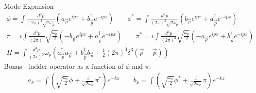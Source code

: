 \documentclass{article}
\begin{document}
Mode Expansion
\begin{equation*}
\begin{gathered}
    \phi = \int \frac{d^3p}{(2\pi)^3\sqrt{2\omega_p}}\left(
        a_{\vec{p}}e^{ipx} + b^\dagger_{\vec{p}}e^{-ipx}
    \right)
    \qquad
    \phi^* = \int \frac{d^3p}{(2\pi)^3\sqrt{2\omega_p}}\left(
        b_{\vec{p}}e^{ipx} + a^\dagger_{\vec{p}}e^{-ipx}
    \right)
    \\
    \pi = i\int \frac{d^3p}{(2\pi)^3}\sqrt{\frac{\omega_p}{2}}\left(
        -b_{\vec{p}}e^{ipx} + a^\dagger_{\vec{p}}e^{-ipx}
    \right)
    \qquad
    \pi^* = i\int \frac{d^3p}{(2\pi)^3}\sqrt{\frac{\omega_p}{2}}\left(
        -a_{\vec{p}}e^{ipx} + b^\dagger_{\vec{p}}e^{-ipx}
    \right)
    \\
    H = \int \frac{d^3p}{(2\pi)^3}\omega_p\left(
        a^\dagger_{\vec{p}}a_{\vec{p}}
        + b^\dagger_{\vec{p}}b_{\vec{p}}
        + \frac{1}{2} \left(2\pi\right)^3 \delta^3(\vec{p} - \vec{p})
    \right)
\end{gathered}
\end{equation*}
Bonus - ladder operator as a function of $\phi$ and $\pi$:
\begin{equation*}
\begin{gathered}
    a_k = \int \left(\sqrt{\frac{\omega_k}{2}}\phi + \frac{i}{\sqrt{2\omega_k}}\pi^*\right)e^{-kx}
    \qquad
    b_k = \int \left(\sqrt{\frac{\omega_k}{2}}\phi^* + \frac{i}{\sqrt{2\omega_k}}\pi\right)e^{-kx}
\end{gathered}
\end{equation*}
\end{document}
